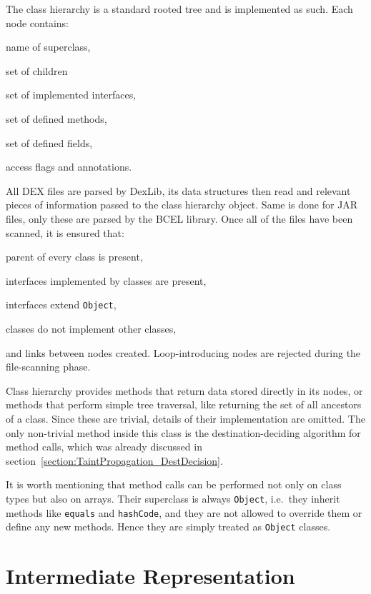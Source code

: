\documentclass[12pt,twoside,notitlepage]{report}
\begin{document}
The class hierarchy is a standard rooted tree and is implemented as such. Each node contains:
\begin{inparaenum}[(i)]
\item name of superclass,
\item set of children
\item set of implemented interfaces,
\item set of defined methods,
\item set of defined fields,
\item access flags and annotations.
\end{inparaenum}

All DEX files are parsed by DexLib, its data structures then read and relevant pieces of information passed to the class hierarchy object. Same is done for JAR files, only these are parsed by the BCEL library. Once all of the files have been scanned, it is ensured that:
\begin{inparaenum}[(i)]
\item parent of every class is present,
\item interfaces implemented by classes are present,
\item interfaces extend \verb$Object$,
\item classes do not implement other classes,
\end{inparaenum}
and links between nodes created. Loop-introducing nodes are rejected during the file-scanning phase.

Class hierarchy provides methods that return data stored directly in its nodes, or methods that perform simple tree traversal, like returning the set of all ancestors of a class. Since these are trivial, details of their implementation are omitted. The only non-trivial method inside this class is the destination-deciding algorithm for method calls, which was already discussed in section~\ref{section:TaintPropagation_DestDecision}. 

It is worth mentioning that method calls can be performed not only on class types but also on arrays. Their superclass is always \verb$Object$, i.e.\ they inherit methods like \verb$equals$ and \verb$hashCode$, and they are not allowed to override them or define any new methods. Hence they are simply treated as \verb$Object$ classes. 

\section{Intermediate Representation}
\end{document}
